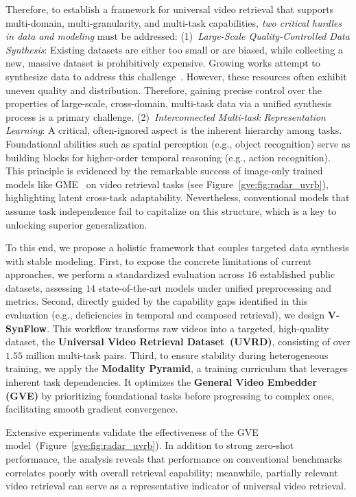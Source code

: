 Therefore, to establish a framework for universal video retrieval that supports multi-domain, multi-granularity, and multi-task capabilities, \textit{two critical hurdles in data and modeling} must be addressed:  
(1)~\textit{Large-Scale Quality-Controlled Data Synthesis}: Existing datasets are either too small or are biased, while collecting a new, massive dataset is prohibitively expensive. Growing works attempt to synthesize data to address this challenge~\cite{chen2023vast,chai2024auroracap,ventura2024covr}. However, these resources often exhibit uneven quality and distribution. Therefore, gaining precise control over the properties of large-scale, cross-domain, multi-task data via a unified synthesis process is a primary challenge.  
(2)~\textit{Interconnected Multi-task Representation Learning}: A critical, often-ignored aspect is the inherent hierarchy among tasks. Foundational abilities such as spatial perception (e.g., object recognition) serve as building blocks for higher-order temporal reasoning (e.g., action recognition). This principle is evidenced by the remarkable success of image-only trained models like GME~\cite{Zhang_2025_CVPR} on video retrieval tasks (see Figure~\ref{gve:fig:radar_uvrb}), highlighting latent cross-task adaptability. Nevertheless, conventional models that assume task independence fail to capitalize on this structure, which is a key to unlocking superior generalization.

To this end, we propose a holistic framework that couples targeted data synthesis with stable modeling.  
First, to expose the concrete limitations of current approaches, we perform a standardized evaluation across $16$ established public datasets, assessing $14$ state-of-the-art models under unified preprocessing and metrics.  
Second, directly guided by the capability gaps identified in this evaluation (e.g., deficiencies in temporal and composed retrieval), we design \textbf{V-SynFlow}. This workflow transforms raw videos into a targeted, high-quality dataset, the \textbf{Universal Video Retrieval Dataset~(UVRD)}, consisting of over $1.55$ million multi-task pairs.  
Third, to ensure stability during heterogeneous training, we apply the \textbf{Modality Pyramid}, a training curriculum that leverages inherent task dependencies. It optimizes the \textbf{General Video Embedder (GVE)} by prioritizing foundational tasks before progressing to complex ones, facilitating smooth gradient convergence.

Extensive experiments validate the effectiveness of the GVE model~(Figure~\ref{gve:fig:radar_uvrb}). In addition to strong zero-shot performance, the analysis reveals that performance on conventional benchmarks correlates poorly with overall retrieval capability; meanwhile, partially relevant video retrieval can serve as a representative indicator of universal video retrieval.

